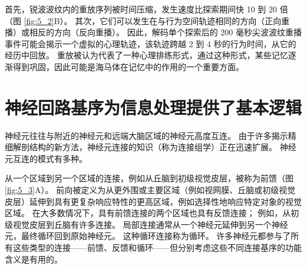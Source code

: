 首先，锐波波纹内的重放序列被时间压缩，发生速度比探索期间快 10 到 20 倍（图 \ref{fig:5_2}B）。 
其次，它们可以发生在与行为空间轨迹相同的方向（正向重播）或相反的方向（反向重播）。 
因此，解码单个探索后的 200 毫秒尖波波纹重播事件可能会揭示一个虚拟的心理轨迹，该轨迹跨越 2 到 4 秒的行为时间，从它的经历中回放。 
重放被认为代表了一种心理排练形式，通过这种形式，某些记忆逐渐得到巩固，因此可能是海马体在记忆中的作用的一个重要方面。


\section{神经回路基序为信息处理提供了基本逻辑}
神经元往往与附近的神经元和远端大脑区域的神经元高度互连。 
由于许多揭示精细解剖结构的新方法，神经元连接的知识（称为连接组学）正在迅速扩展。 
神经元互连的模式有多种。


从一个区域到另一个区域的连接，例如从丘脑到初级视觉皮层，被称为前馈（图 \ref{fig:5_3}A）。 
前向被定义为从更外围或主要区域（例如视网膜、丘脑或初级视觉皮层）延伸到具有更复杂响应特性的更高区域，例如选择性地响应特定对象的视觉区域。 
在大多数情况下，具有前馈连接的两个区域也具有反馈连接； 例如，从初级视觉皮层到丘脑有许多连接。 
局部连接通常从一个神经元延伸到另一个神经元，最终循环回到原始神经元。 这种循环连接称为循环。
许多神经元都参与了所有这些类型的连接——前馈、反馈和循环——但分别考虑这些不同连接基序的功能含义是有用的。


